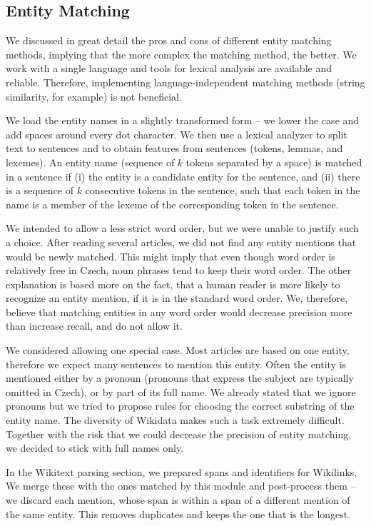 \subsection{Entity Matching}
\label{sec:entity_matching_implementace}
We discussed in great detail the pros and cons of different entity matching methods, implying that the more complex the matching method, the better. We work with a single language and tools for lexical analysis are available and reliable. Therefore, implementing language-independent matching methods (string similarity, for example) is not beneficial. 

We load the entity names in a slightly transformed form -- we lower the case and add spaces around every dot character. We then use a lexical analyzer to split text to sentences and to obtain features from sentences (tokens, lemmas, and lexemes). An entity name (sequence of $k$ tokens separated by a space) is matched in a sentence if (i) the entity is a candidate entity for the sentence, and (ii) there is a sequence of $k$ consecutive tokens in the sentence, such that each token in the name is a member of the lexeme of the corresponding token in the sentence. 

We intended to allow a less strict word order, but we were unable to justify such a choice. After reading several articles, we did not find any entity mentions that would be newly matched. This might imply that even though word order is relatively free in Czech, noun phrases tend to keep their word order. The other explanation is based more on the fact, that a human reader is more likely to recognize an entity mention, if it is in the standard word order. We, therefore, believe that matching entities in any word order would decrease precision more than increase recall, and do not allow it.

We considered allowing one special case. Most articles are based on one entity, therefore we expect many sentences to mention this entity. Often the entity is mentioned either by a pronoun (pronouns that express the subject are typically omitted in Czech), or by part of its full name. We already stated that we ignore pronouns but we tried to propose rules for choosing the correct substring of the entity name. The diversity of Wikidata makes such a task extremely difficult. Together with the risk that we could decrease the precision of entity matching, we decided to stick with full names only.

In the Wikitext parsing section, we prepared spans and identifiers for Wikilinks. We merge these with the ones matched by this module and post-process them -- we discard each mention, whose span is within a span of a different mention of the same entity. This removes duplicates and keeps the one that is the longest.


